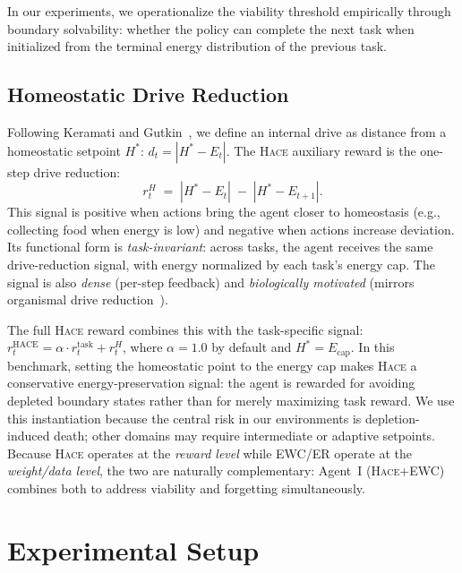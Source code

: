 \documentclass[sigplan,10pt]{acmart}
\newcommand{\setpoint}{H^*}
\newcommand{\energy}{E}
\newcommand{\drive}{d}
\newcommand{\reward}{r}
\newcommand{\hace}{\textsc{Hace}}
\begin{document}
In our experiments, we operationalize the viability threshold empirically
through boundary solvability: whether the policy can complete the next
task when initialized from the terminal energy distribution of the
previous task.

\subsection{Homeostatic Drive Reduction}

Following Keramati and Gutkin~\cite{keramati2014}, we define an internal
drive as distance from a homeostatic setpoint $\setpoint$:
$\drive_t = |\setpoint - \energy_t|$.  The \hace{} auxiliary reward is
the one-step drive reduction:
\begin{equation}
  \reward_t^H \;=\; |\setpoint - \energy_t| \;-\; |\setpoint - \energy_{t+1}|.
  \label{eq:drive}
\end{equation}
This signal is positive when actions bring the agent closer to homeostasis
(e.g., collecting food when energy is low) and negative when actions
increase deviation.  Its functional form is \emph{task-invariant}: across
tasks, the agent receives the same drive-reduction signal, with energy
normalized by each task's energy cap.  The signal is also \emph{dense}
(per-step feedback) and \emph{biologically motivated}
(mirrors organismal drive reduction~\cite{keramati2014,konidaris2006}).

The full \hace{} reward combines this with the task-specific signal:
$\reward_t^{\text{HACE}} = \alpha \cdot \reward_t^{\text{task}} + \reward_t^H$,
where $\alpha = 1.0$ by default and $\setpoint = \energy_{\text{cap}}$.
In this benchmark, setting the homeostatic point to the energy cap makes
\hace{} a conservative energy-preservation signal: the agent is rewarded
for avoiding depleted boundary states rather than for merely maximizing
task reward.  We use this instantiation because the central risk in our
environments is depletion-induced death; other domains may require
intermediate or adaptive setpoints.
Because \hace{} operates at the \emph{reward level} while EWC/ER operate
at the \emph{weight/data level}, the two are naturally complementary: Agent~I
(\hace{}+EWC) combines both to address viability and forgetting
simultaneously.


\section{Experimental Setup}
\label{sec:setup}
\end{document}
